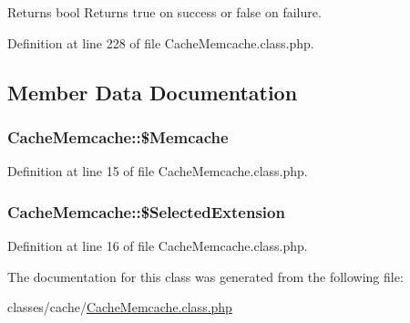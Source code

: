 \begin{DoxyReturn}{Returns}
bool Returns true on success or false on failure. 
\end{DoxyReturn}


Definition at line 228 of file Cache\-Memcache.\-class.\-php.



\subsection{Member Data Documentation}
\hypertarget{classCacheMemcache_a56ac8c11dec3851aee654babe49d20f8}{
\subsubsection[{\$\-Memcache}]{\setlength{\rightskip}{0pt plus 5cm}Cache\-Memcache\-::\$\-Memcache}}\label{classCacheMemcache_a56ac8c11dec3851aee654babe49d20f8}


Definition at line 15 of file Cache\-Memcache.\-class.\-php.

\hypertarget{classCacheMemcache_aa555524556a771c296da72959be34e2d}{
\subsubsection[{\$\-Selected\-Extension}]{\setlength{\rightskip}{0pt plus 5cm}Cache\-Memcache\-::\$\-Selected\-Extension}}\label{classCacheMemcache_aa555524556a771c296da72959be34e2d}


Definition at line 16 of file Cache\-Memcache.\-class.\-php.



The documentation for this class was generated from the following file\-:\begin{DoxyCompactItemize}
\item 
classes/cache/\hyperlink{CacheMemcache_8class_8php}{Cache\-Memcache.\-class.\-php}\end{DoxyCompactItemize}
